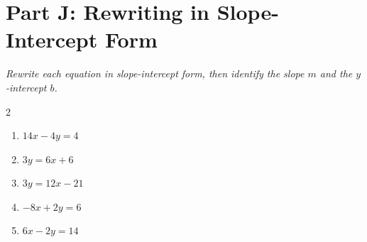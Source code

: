 \documentclass[11pt]{article}
\begin{document}
\section*{Part J: Rewriting in Slope-Intercept Form}
\noindent\textit{Rewrite each equation in slope-intercept form, then identify the slope $m$ and the $y$-intercept $b$.}
\begin{multicols}{2}
\begin{enumerate}
  \item $14x - 4y = 4$
  \vspace{1.8cm}
  \item $3y = 6x + 6$
  \vspace{1.8cm}
  \item $3y = 12x - 21$
  \vspace{1.8cm}
  \item $-8x + 2y = 6$
  \vspace{1.8cm}
  \item $6x - 2y = 14$
  \vspace{1.8cm}
\end{enumerate}
\end{multicols}
\end{document}
